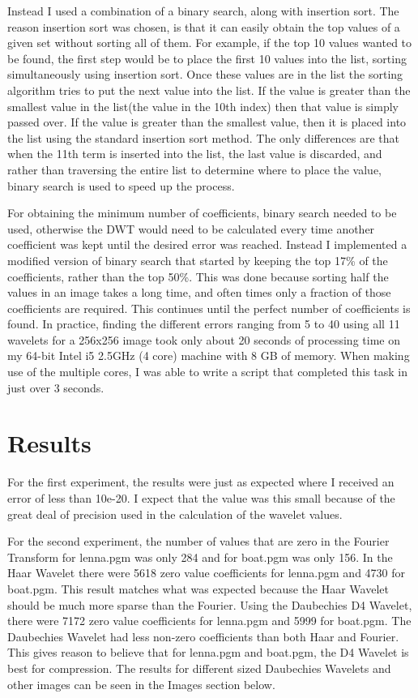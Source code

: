 Instead I used a combination of a binary search, along with insertion sort.  The reason insertion sort was chosen, is that it can easily obtain the top values of a given set without sorting all of them.  For example, if the top 10 values wanted to be found, the first step would be to place the first 10 values into the list, sorting simultaneously using insertion sort.  Once these values are in the list the sorting algorithm tries to put the next value into the list.  If the value is greater than the smallest value in the list(the value in the 10th index) then that value is simply passed over.  If the value is greater than the smallest value, then it is placed into the list using the standard insertion sort method.  The only differences are that when the 11th term is inserted into the list, the last value is discarded, and rather than traversing the entire list to determine where to place the value, binary search is used to speed up the process.

For obtaining the minimum number of coefficients, binary search needed to be used, otherwise the DWT would need to be calculated every time another coefficient was kept until the desired error was reached.  Instead I implemented a modified version of binary search that started by keeping the top 17\% of the coefficients, rather than the top 50\%.  This was done because sorting half the values in an image takes a long time, and often times only a fraction of those coefficients are required.  This continues until the perfect number of coefficients is found.  In practice, finding the different errors ranging from 5 to 40 using all 11 wavelets for a 256x256 image took only about 20 seconds of processing time on my 64-bit Intel i5 2.5GHz (4 core) machine with 8 GB of memory.  When making use of the multiple cores, I was able to write a script that completed this task in just over 3 seconds.

\section{Results}

For the first experiment, the results were just as expected where I received an error of less than 10e-20.  I expect that the value was this small because of the great deal of precision used in the calculation of the wavelet values.

For the second experiment, the number of values that are zero in the Fourier Transform for lenna.pgm was only 284 and for boat.pgm was only 156. In the Haar Wavelet there were 5618 zero value coefficients for lenna.pgm and 4730 for boat.pgm.  This result matches what was expected because the Haar Wavelet should be much more sparse than the Fourier.  Using the Daubechies D4 Wavelet, there were 7172 zero value coefficients for lenna.pgm and 5999 for boat.pgm.  The Daubechies Wavelet had less non-zero coefficients than both Haar and Fourier.  This gives reason to believe that for lenna.pgm and boat.pgm, the D4 Wavelet is best for compression.  The results for different sized Daubechies Wavelets and other images can be seen in the Images section below.

